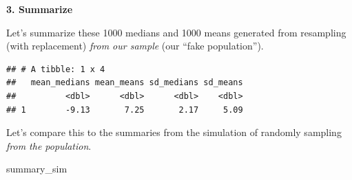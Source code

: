\documentclass[]{book}
\newenvironment{Shaded}{\begin{snugshade}}{\end{snugshade}}
\newcommand{\CommentTok}[1]{\textcolor[rgb]{0.56,0.35,0.01}{\textit{#1}}}
\newcommand{\DataTypeTok}[1]{\textcolor[rgb]{0.13,0.29,0.53}{#1}}
\newcommand{\DecValTok}[1]{\textcolor[rgb]{0.00,0.00,0.81}{#1}}
\newcommand{\KeywordTok}[1]{\textcolor[rgb]{0.13,0.29,0.53}{\textbf{#1}}}
\newcommand{\NormalTok}[1]{#1}
\newcommand{\OperatorTok}[1]{\textcolor[rgb]{0.81,0.36,0.00}{\textbf{#1}}}
\newcommand{\OtherTok}[1]{\textcolor[rgb]{0.56,0.35,0.01}{#1}}
\newcommand{\StringTok}[1]{\textcolor[rgb]{0.31,0.60,0.02}{#1}}
\begin{document}
\begin{Shaded}
\end{Shaded}

\textbf{3. Summarize}

Let's summarize these 1000 medians and 1000 means generated from resampling (with replacement) \emph{from our sample} (our ``fake population'').

\begin{Shaded}
\end{Shaded}

\begin{verbatim}
## # A tibble: 1 x 4
##   mean_medians mean_means sd_medians sd_means
##          <dbl>      <dbl>      <dbl>    <dbl>
## 1        -9.13       7.25       2.17     5.09
\end{verbatim}

Let's compare this to the summaries from the simulation of randomly sampling \emph{from the population}.

\begin{Shaded}
\begin{Highlighting}[]
\NormalTok{summary_sim}
\end{Highlighting}
\end{Shaded}
\end{document}

